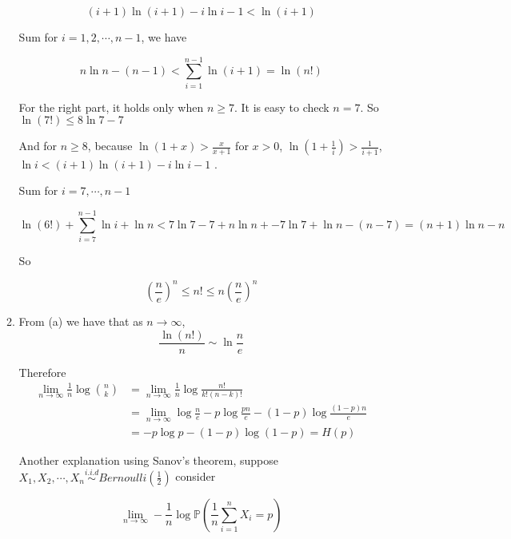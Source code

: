 \documentclass[a4paper]{article}
\begin{document}
\begin{enumerate}
\begin{enumerate}
\begin{equation}
  (i+1) \ln(i+1) - i\ln i -1 < \ln(i+1)
\end{equation}

Sum for $i=1,2,\cdots,n-1$, we have 

\begin{equation}
  n\ln n - (n-1) < \sum_{i=1}^{n-1} \ln(i+1) = \ln (n!)
\end{equation}

For the right part, it holds only when $n\geqslant 7$. It is easy to check $n =7 $. So $\ln(7!) \leqslant 8\ln 7 - 7$

And for $n \geqslant 8$, because $\ln (1+x) > \frac{x}{x+1}$ for $x>0$, $\ln (1+ \frac 1 i ) > \frac{1}{i+1}$, $\ln i < (i+1)\ln (i+1) - i \ln i -1$ . 

Sum for $i=7,\cdots, n-1$

\begin{equation}
  \ln(6!)  + \sum_{i=7}^{n-1} \ln i + \ln n < 7\ln 7 - 7  + n\ln n + - 7\ln  7 + \ln n  - (n-7) = (n+1) \ln n - n
\end{equation}

So 

\begin{equation}
  \left(\frac{n}{e}\right)^{n} \leqslant n ! \leqslant n\left(\frac{n}{e}\right)^{n}
\end{equation}

\item From (a) we have that as $n \to \infty$,
\begin{equation}
  \frac{\ln (n!)}{n} \sim \ln \frac{n}{e}
\end{equation}

Therefore
\begin{equation}
  \begin{aligned}
    \lim _{n \to \infty} \frac{1}{n} \log \binom{n}{k} & = \lim _{n \to \infty} \frac{1}{n} \log \frac{n!}{k!(n-k)!}  \\ & = \lim _{n \to \infty} \log \frac{n}{e} - p \log \frac{pn}{e} - (1-p) \log \frac{(1-p)n}{e} \\
    & = -p\log p - (1-p) \log (1-p) = H(p)
  \end{aligned}
\end{equation}

Another explanation using Sanov's theorem, suppose $X_1,X_2,\cdots,X_n \overset{i.i.d}{\sim} Bernoulli(\frac{1}{2})$ consider 

\begin{equation}
  \lim_{n\to \infty} -\frac{1}{n} \log \mathbb{P}(\frac{1}{n} \sum_{i=1}^n X_i= p) 
\end{equation}


\end{enumerate}
\end{enumerate}
\end{document}
